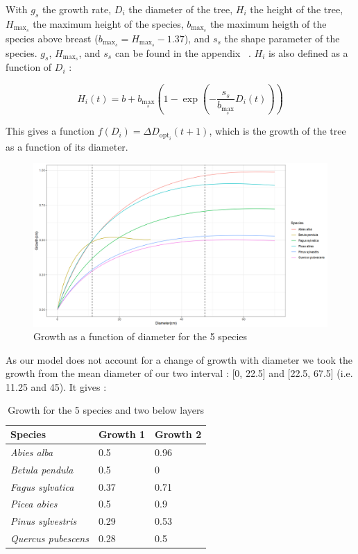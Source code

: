 \documentclass{article}
\begin{document}
With $g_s$ the growth rate, $D_i$ the diameter of the tree, $H_i$ the height of the tree, $H_{\max _s}$ the maximum height of the species, $b_{\max _s}$ the maximum heigth of the species above breast ($b_{\max _s} =  H_{\max _s} - 1.37$), and $s_s$ the shape parameter of the species. $g_s$, $H_{\max _s}$, and $s_s$ can be found in the appendix ~\autocite{morinForestSuccessionGap2021}. $H_i$ is also defined as a function of $D_i$ :

\begin{equation}
    H_i(t)=b+b_{\max _s}\left(1-\exp \left(-\frac{s_s}{b_{\max _s}} D_i(t)\right)\right)
    \label{eq:height}
\end{equation}

This gives a function $f(D_i) = \Delta D_{\mathrm{opt}_i}(t+1)$, which is the growth of the tree as a function of its diameter.

\begin{figure}
    \centering
    \includegraphics[width=\textwidth]{Figure/Parametrisation/Growth_diameter.png}
    \caption{Growth as a function of diameter for the 5 species}
    \label{fig:growth_diameter}
\end{figure}

As our model does not account for a change of growth with diameter we took the growth from the mean diameter of our two interval : [0, 22.5] and [22.5, 67.5] (i.e. 11.25 and 45). It gives :

\begin{table}[H]
\begin{center}
    \begin{tabular}{lll}
    \hline
    Species & Growth 1 & Growth 2 \\ \hline
    \textit{Abies alba} & 0.5 & 0.96 \\
    \textit{Betula pendula} & 0.5 & 0 \\
    \textit{Fagus sylvatica} & 0.37 & 0.71 \\
    \textit{Picea abies} & 0.5 & 0.9 \\
    \textit{Pinus sylvestris} & 0.29 & 0.53 \\
    \textit{Quercus pubescens} & 0.28 & 0.5 \\ \hline
    \end{tabular}
    \caption{Growth for the 5 species and two below layers}
\end{center}
\end{table}
\end{document}
